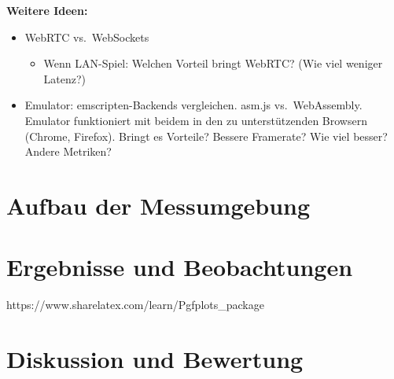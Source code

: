 \textbf{Weitere Ideen:}

\begin{itemize}
\tightlist
\item
  WebRTC vs.~WebSockets

  \begin{itemize}
  \tightlist
  \item
    Wenn LAN-Spiel: Welchen Vorteil bringt WebRTC? (Wie viel weniger
    Latenz?)
  \end{itemize}
\item
  Emulator: emscripten-Backends vergleichen. asm.js vs.~WebAssembly.
  Emulator funktioniert mit beidem in den zu unterstützenden Browsern
  (Chrome, Firefox). Bringt es Vorteile? Bessere Framerate? Wie viel
  besser? Andere Metriken?
\end{itemize}

\section{Aufbau der Messumgebung}\label{aufbau-der-messumgebung}

\section{Ergebnisse und
Beobachtungen}\label{ergebnisse-und-beobachtungen}

https://www.sharelatex.com/learn/Pgfplots\_package


\section{Diskussion und Bewertung}\label{diskussion-und-bewertung}
